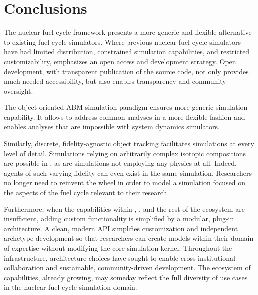 

\section{Conclusions}



The \Cyclus nuclear fuel cycle framework presents a more generic and flexible
alternative to existing fuel cycle simulators. Where previous nuclear fuel cycle simulators have had limited distribution,
constrained simulation capabilities, and restricted customizability, \Cyclus emphasizes an
open access and development strategy.  Open development, with transparent
publication of the source code, not only provides much-needed accessibility,
but also enables transparency and community oversight.

The object-oriented \gls{ABM} simulation paradigm ensures more generic
simulation capability. It allows \Cyclus to address common analyses in a more
flexible fashion and enables analyses that are impossible with system dynamics
simulators.

Similarly, discrete, fidelity-agnostic object tracking facilitates simulations
at every level of detail. Simulations relying on arbitrarily complex isotopic
compositions are possible in \Cyclus, as are simulations not employing any
physics at all. Indeed, agents of such varying fidelity can even exist in the
same simulation. Researchers no longer need to reinvent the wheel in order to
model a simulation focused on the aspects of the fuel cycle
relevant to their research.

Furthermore, when the capabilities within \Cyclus, \Cycamore, and the rest of
the ecosystem are insufficient, adding custom functionality is simplified by a
modular, plug-in architecture. A clean, modern \gls{API} simplifies
customization and independent archetype development so that researchers can
create models within their domain of expertise without modifying the core
simulation kernel. Throughout the \Cyclus
infrastructure, architecture choices have sought to enable cross-institutional
collaboration and sustainable, community-driven development. The ecosystem
of capabilities, already growing, may someday reflect the full diversity of use
cases in the nuclear fuel cycle simulation domain.


